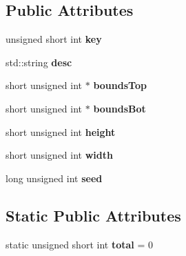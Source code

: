 \subsection*{Public Attributes}
\begin{DoxyCompactItemize}
\item 
\hypertarget{classSubdungeon_a5a50392f3647f13070db3d80367a7cde}{unsigned short int {\bfseries key}}\label{classSubdungeon_a5a50392f3647f13070db3d80367a7cde}

\item 
\hypertarget{classSubdungeon_a3eb4781eae8a156f65dfdde5d50ed5f6}{std\+::string {\bfseries desc}}\label{classSubdungeon_a3eb4781eae8a156f65dfdde5d50ed5f6}

\item 
\hypertarget{classSubdungeon_a32665fe2396afdff10ed2cd6a705a761}{short unsigned int $\ast$ {\bfseries bounds\+Top}}\label{classSubdungeon_a32665fe2396afdff10ed2cd6a705a761}

\item 
\hypertarget{classSubdungeon_ac5942d0a351ce74c47126cb1dc8fee2a}{short unsigned int $\ast$ {\bfseries bounds\+Bot}}\label{classSubdungeon_ac5942d0a351ce74c47126cb1dc8fee2a}

\item 
\hypertarget{classSubdungeon_a833db8933202cd22ce456495c9170c5d}{short unsigned int {\bfseries height}}\label{classSubdungeon_a833db8933202cd22ce456495c9170c5d}

\item 
\hypertarget{classSubdungeon_a71a01075b2557ee2e4a82a0504bbfc3c}{short unsigned int {\bfseries width}}\label{classSubdungeon_a71a01075b2557ee2e4a82a0504bbfc3c}

\item 
\hypertarget{classSubdungeon_a9fe913b68fb8e8b3ffcc264385c09033}{long unsigned int {\bfseries seed}}\label{classSubdungeon_a9fe913b68fb8e8b3ffcc264385c09033}

\end{DoxyCompactItemize}
\subsection*{Static Public Attributes}
\begin{DoxyCompactItemize}
\item 
\hypertarget{classSubdungeon_a1aadcf8cf6c7a84c9d6a2e1c12cea5c2}{static unsigned short int {\bfseries total} = 0}\label{classSubdungeon_a1aadcf8cf6c7a84c9d6a2e1c12cea5c2}

\end{DoxyCompactItemize}


